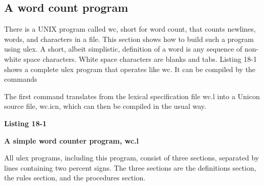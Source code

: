 \subsection{A word count program}

There is a UNIX program called \textsf{wc}, short for word count, that counts newlines, words, and characters in a
file. This section shows how to build such a program using
\textsf{ulex}. A short, albeit simplistic, definition of a word is any
sequence of non-white space characters. White space characters are
blanks and tabs. Listing 18-1 shows a complete \textsf{ulex} program that
operates like \textsf{wc}.  It can be compiled by the commands


The first command translates from the lexical specification file wc.l into a
Unicon source file, wc.icn, which can then be compiled in the usual way.

\bigskip

{\sffamily\bfseries
Listing 18-1}

{\sffamily\bfseries
A simple word counter program, wc.l}


All \textsf{ulex} programs, including this program, consist of three
sections, separated by lines containing two percent signs. The three
sections are the definitions section, the rules section, and the
procedures section.

